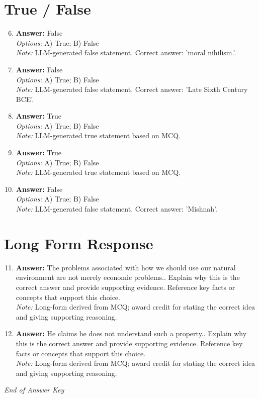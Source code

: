 \documentclass[12pt]{article}
\begin{document}
\section*{True / False}
\begin{enumerate}[label=\arabic*.]
\setcounter{enumi}{5}
\item \textbf{Answer:} False
\\ \textit{Options:} A) True; B) False
\\ \textit{Note:} LLM-generated false statement. Correct answer: 'moral nihilism.'.
\item \textbf{Answer:} False
\\ \textit{Options:} A) True; B) False
\\ \textit{Note:} LLM-generated false statement. Correct answer: 'Late Sixth Century BCE'.
\item \textbf{Answer:} True
\\ \textit{Options:} A) True; B) False
\\ \textit{Note:} LLM-generated true statement based on MCQ.
\item \textbf{Answer:} True
\\ \textit{Options:} A) True; B) False
\\ \textit{Note:} LLM-generated true statement based on MCQ.
\item \textbf{Answer:} False
\\ \textit{Options:} A) True; B) False
\\ \textit{Note:} LLM-generated false statement. Correct answer: 'Mishnah'.
\end{enumerate}

\section*{Long Form Response}
\begin{enumerate}[label=\arabic*.]
\setcounter{enumi}{10}
\item \textbf{Answer:} The problems associated with how we should use our natural environment are not merely economic problems.. Explain why this is the correct answer and provide supporting evidence. Reference key facts or concepts that support this choice.
\\ \textit{Note:} Long-form derived from MCQ; award credit for stating the correct idea and giving supporting reasoning.
\item \textbf{Answer:} He claims he does not understand such a property.. Explain why this is the correct answer and provide supporting evidence. Reference key facts or concepts that support this choice.
\\ \textit{Note:} Long-form derived from MCQ; award credit for stating the correct idea and giving supporting reasoning.
\end{enumerate}

\vfill
\noindent\textit{End of Answer Key}
\end{document}
